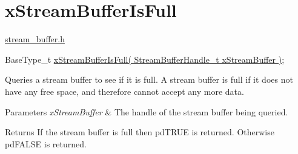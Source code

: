 \hypertarget{group__x_stream_buffer_is_full}{}\section{x\+Stream\+Buffer\+Is\+Full}
\label{group__x_stream_buffer_is_full}
\hyperlink{stream__buffer_8h}{stream\+\_\+buffer.\+h}


\begin{DoxyPre}
BaseType\_t \hyperlink{stream__buffer_8h_ae393d82ee06e89692248a4381f85dc86}{xStreamBufferIsFull( StreamBufferHandle\_t xStreamBuffer )};
\end{DoxyPre}


Queries a stream buffer to see if it is full. A stream buffer is full if it does not have any free space, and therefore cannot accept any more data.


\begin{DoxyParams}{Parameters}
{\em x\+Stream\+Buffer} & The handle of the stream buffer being queried.\\
\hline
\end{DoxyParams}
\begin{DoxyReturn}{Returns}
If the stream buffer is full then pd\+T\+R\+UE is returned. Otherwise pd\+F\+A\+L\+SE is returned. 
\end{DoxyReturn}
